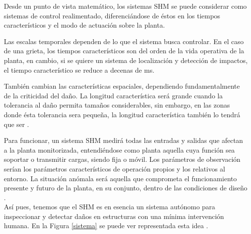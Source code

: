 Desde un punto de vista matemático, los sistemas SHM se puede considerar como sistemas de control realimentado, diferenciándose de éstos en los tiempos característicos y el modo de actuación sobre la planta.  %

Las escalas temporales dependen de lo que el sistema busca controlar. En el caso de una grieta, los tiempos característicos son del orden de la vida operativa de la planta, en cambio, si se quiere un sistema de localización y detección de impactos, el tiempo característico se reduce a decenas de ms. 

También cambian las características espaciales, dependiendo fundamentalmente de la criticidad del daño. La longitud característica será grande cuando la tolerancia al daño permita tamaños considerables, sin embargo, en las zonas donde ésta tolerancia sera pequeña, la longitud característica también lo tendrá que ser \cite{Jaime_Tesis}.

Para funcionar, un sistema SHM medirá todas las entradas y salidas que afectan a la planta monitorizada, entendiéndose como planta aquella cuya función sea soportar o transmitir cargas, siendo fija o móvil. Los parámetros de observación serían los parámetros característicos de operación propios y los relativos al entorno. La situación anómala será aquella que comprometa el funcionamiento presente y futuro de la planta, en su conjunto, dentro de las condiciones de diseño \cite{civil}.\\

Así pues, tenemos que el SHM es en esencia un sistema autónomo para inspeccionar y detectar daños en estructuras con una mínima intervención humana. En la Figura \ref{sistema} se puede ver representada esta idea \cite{Jaime_Tesis}.

